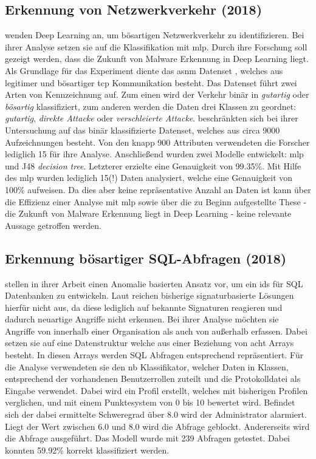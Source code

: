 \documentclass[
    12pt, %
    DIV10,
    ngerman, %
    a4paper, %
    oneside, %
    titlepage, %
    parskip=half, %
    headings=normal, %
    listof=totoc, %
    bibliography=totoc, %
    index=totoc, %
    captions=tableheading, %
    final %
]{scrreprt}
\begin{document}
\subsection{Erkennung von Netzwerkverkehr (2018)}\label{asnm}
\textcite{Teoh2018} wenden Deep Learning an, um bösartigen Netzwerkverkehr zu identifizieren. Bei ihrer Analyse setzen sie auf die Klassifikation mit \ac{mlp}. Durch ihre Forschung soll gezeigt werden, dass die Zukunft von Malware Erkennung in Deep Learning liegt. Als Grundlage für das Experiment diente das \ac{asnm} Datenset \parencite{phdthesis}, welches aus legitimer und bösartiger \ac{tcp} Kommunikation besteht. Das Datenset führt zwei Arten von Kennzeichnung auf. Zum einen wird der Verkehr binär in \emph{gutartig} oder \emph{bösartig} klassifiziert, zum anderen werden die Daten drei Klassen zu geordnet: \emph{gutartig}, \emph{direkte Attacke} oder \emph{verschleierte Attacke}. \textcite{Teoh2018} beschränkten sich bei ihrer Untersuchung auf das binär klassifizierte Datenset, welches aus circa 9000 Aufzeichnungen besteht. Von den knapp 900 Attributen verwendeten die Forscher lediglich 15 für ihre Analyse. Anschließend wurden zwei Modelle entwickelt: \ac{mlp} und J48 \emph{decision tree}. Letzterer erzielte eine Genauigkeit von 99.35\%. Mit Hilfe des \ac{mlp} wurden lediglich 15(!) Daten analysiert, welche eine Genauigkeit von 100\% aufweisen. Da dies aber keine repräsentative Anzahl an Daten ist kann über die Effizienz einer Analyse mit \ac{mlp} sowie über die zu Beginn aufgestellte These - die Zukunft von Malware Erkennung liegt in Deep Learning - keine relevante Aussage getroffen werden. 
%
\subsection{Erkennung bösartiger SQL-Abfragen (2018)}
\textcite{Jayaprakash2018} stellen in ihrer Arbeit einen Anomalie basierten Ansatz vor, um ein \ac{ids} für SQL Datenbanken zu entwickeln. Laut \textcite{Jayaprakash2018} reichen bisherige signaturbasierte Lösungen hierfür nicht aus, da diese lediglich auf bekannte Signaturen reagieren und dadurch neuartige Angriffe nicht erkennen. Bei ihrer Analyse möchten sie Angriffe von innerhalb einer Organisation als auch von außerhalb erfassen. Dabei setzen sie auf eine Datenstruktur welche aus einer Beziehung von acht Arrays besteht. In diesen Arrays werden SQL Abfragen entsprechend repräsentiert. Für die Analyse verwendeten sie den \acl{nb} Klassifikator, welcher Daten in Klassen, entsprechend der vorhandenen Benutzerrollen zuteilt und die Protokolldatei als Eingabe verwendet. Dabei wird ein Profil erstellt, welches mit bisherigen Profilen verglichen, und mit einem Punktesystem von 0 bis 10 bewertet wird. Befindet sich der dabei ermittelte Schweregrad über 8.0 wird der Administrator alarmiert. Liegt der Wert zwischen 6.0 und 8.0 wird die Abfrage geblockt. Andererseits wird die Abfrage ausgeführt. Das Modell wurde mit 239 Abfragen getestet. Dabei konnten 59.92\% korrekt klassifiziert werden.
%
\end{document}
